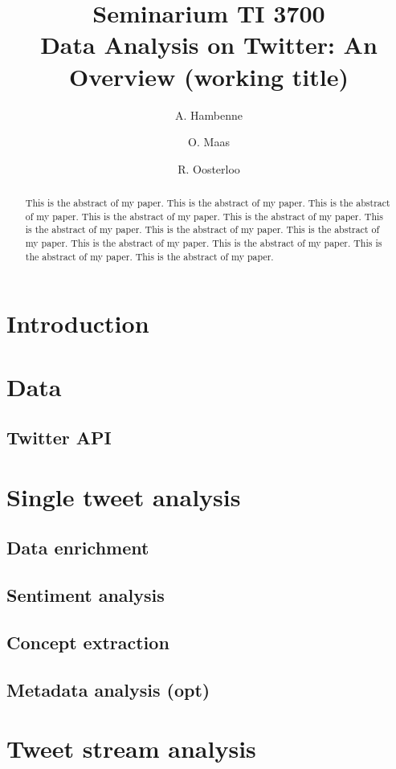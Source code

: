 \documentclass{article}
\title{Seminarium TI 3700\\ Data Analysis on Twitter: An Overview (working title)}
\author{A. Hambenne  \and
    O. Maas \and
    R. Oosterloo}
\date{}
\begin{document}
\maketitle
\thispagestyle{empty}

\begin{abstract}
This is the abstract of my paper.
This is the abstract of my paper.
This is the abstract of my paper.
This is the abstract of my paper.
This is the abstract of my paper.
This is the abstract of my paper.
This is the abstract of my paper.
This is the abstract of my paper.
This is the abstract of my paper.
This is the abstract of my paper.
This is the abstract of my paper.
This is the abstract of my paper.
\end{abstract}


\section{Introduction}


\section{Data}

\subsection{Twitter API}

\section{Single tweet analysis}
\subsection{Data enrichment}
\subsection{Sentiment analysis}
\subsection{Concept extraction}
\subsection{Metadata analysis (opt)}

\section{Tweet stream analysis}
\end{document}
